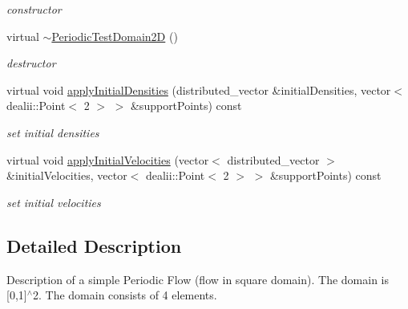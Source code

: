 \begin{DoxyCompactItemize}
\begin{DoxyCompactList}\small\item\em constructor \end{DoxyCompactList}\item 
\hypertarget{classnatrium_1_1PeriodicTestDomain2D_a7addeeedd4ece6367394ce17eb7cb589}{virtual \hyperlink{classnatrium_1_1PeriodicTestDomain2D_a7addeeedd4ece6367394ce17eb7cb589}{$\sim$\-Periodic\-Test\-Domain2\-D} ()}\label{classnatrium_1_1PeriodicTestDomain2D_a7addeeedd4ece6367394ce17eb7cb589}

\begin{DoxyCompactList}\small\item\em destructor \end{DoxyCompactList}\item 
virtual void \hyperlink{classnatrium_1_1PeriodicTestDomain2D_abd87cfcf8cd6178c435bec6365923069}{apply\-Initial\-Densities} (distributed\-\_\-vector \&initial\-Densities, vector$<$ dealii\-::\-Point$<$ 2 $>$ $>$ \&support\-Points) const 
\begin{DoxyCompactList}\small\item\em set initial densities \end{DoxyCompactList}\item 
virtual void \hyperlink{classnatrium_1_1PeriodicTestDomain2D_aaf2befcb4b723013ed156b67439e718a}{apply\-Initial\-Velocities} (vector$<$ distributed\-\_\-vector $>$ \&initial\-Velocities, vector$<$ dealii\-::\-Point$<$ 2 $>$ $>$ \&support\-Points) const 
\begin{DoxyCompactList}\small\item\em set initial velocities \end{DoxyCompactList}\end{DoxyCompactItemize}


\subsection{Detailed Description}
Description of a simple Periodic Flow (flow in square domain). The domain is \mbox{[}0,1\mbox{]}$^\wedge$2. The domain consists of 4 elements. 

